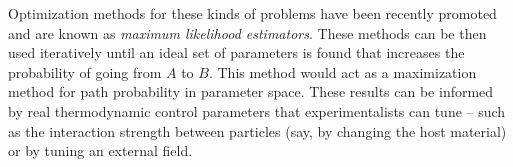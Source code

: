 \documentclass[11pt]{article}
\begin{document}
Optimization methods for these kinds of problems have been recently promoted and are known as {\it maximum likelihood estimators}. %
These methods can be then used iteratively until an ideal set of parameters is found that increases the probability of going from $A$ to $B$.  This method would act as a maximization method for path probability in parameter space.  These results can be informed by real thermodynamic control parameters that experimentalists can tune -- such as the interaction strength between particles (say, by changing the host material) or by tuning an external field.\\
\end{document}
